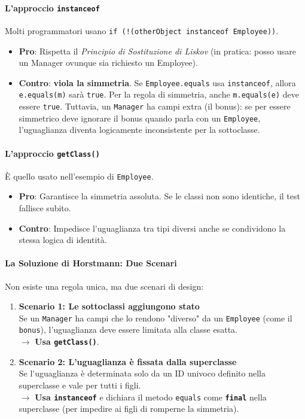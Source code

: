 \paragraph{L'approccio \texttt{instanceof}}
Molti programmatori usano \texttt{if (!(otherObject instanceof Employee))}. 
\begin{itemize}
    \item \textbf{Pro}: Rispetta il \textit{Principio di Sostituzione di Liskov} (in pratica: posso usare un Manager ovunque sia richiesto un Employee).
    \item \textbf{Contro}: \textbf{viola la simmetria}. 
    Se \texttt{Employee.equals} usa \texttt{instanceof}, allora \texttt{e.equals(m)} sarà \texttt{true}. Per la regola di simmetria, anche \texttt{m.equals(e)} deve essere \texttt{true}. Tuttavia, un \texttt{Manager} ha campi extra (il bonus): se per essere simmetrico deve ignorare il bonus quando parla con un \texttt{Employee}, l'uguaglianza diventa logicamente inconsistente per la sottoclasse.
\end{itemize}

\paragraph{L'approccio \texttt{getClass()}}
È quello usato nell'esempio di \texttt{Employee}.
\begin{itemize}
    \item \textbf{Pro}: Garantisce la simmetria assoluta. Se le classi non sono identiche, il test fallisce subito.
    \item \textbf{Contro}: Impedisce l'uguaglianza tra tipi diversi anche se condividono la stessa logica di identità.
\end{itemize}



\paragraph{La Soluzione di Horstmann: Due Scenari}
Non esiste una regola unica, ma due scenari di design:

\begin{enumerate}
    \item \textbf{Scenario 1: Le sottoclassi aggiungono stato} \\
    Se un \texttt{Manager} ha campi che lo rendono "diverso" da un \texttt{Employee} (come il \texttt{bonus}), l'uguaglianza deve essere limitata alla classe esatta. \\
    $\rightarrow$ \textbf{Usa \texttt{getClass()}}.
    
    \item \textbf{Scenario 2: L'uguaglianza è fissata dalla superclasse} \\
    Se l'uguaglianza è determinata solo da un ID univoco definito nella superclasse e vale per tutti i figli. \\
    $\rightarrow$ \textbf{Usa \texttt{instanceof}} e dichiara il metodo \texttt{equals} come \textbf{\texttt{final}} nella superclasse (per impedire ai figli di romperne la simmetria).
\end{enumerate}

